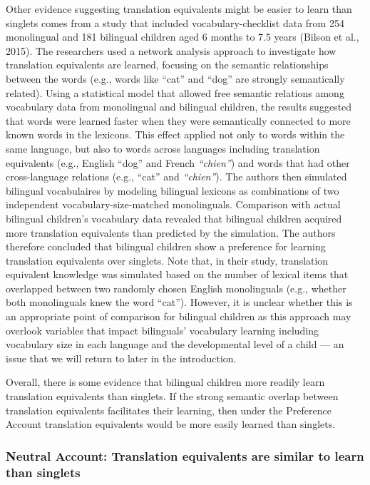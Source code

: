 \documentclass[
  english,
  ,man,floatsintext]{apa6}
\begin{document}
Other evidence suggesting translation equivalents might be easier to learn than singlets comes from a study that included vocabulary-checklist data from 254 monolingual and 181 bilingual children aged 6 months to 7.5 years (Bilson et al., 2015). The researchers used a network analysis approach to investigate how translation equivalents are learned, focusing on the semantic relationships between the words (e.g., words like ``cat'' and ``dog'' are strongly semantically related). Using a statistical model that allowed free semantic relations among vocabulary data from monolingual and bilingual children, the results suggested that words were learned faster when they were semantically connected to more known words in the lexicons. This effect applied not only to words within the same language, but also to words across languages including translation equivalents (e.g., English ``dog'' and French \emph{``chien''}) and words that had other cross-language relations (e.g., ``cat'' and \emph{``chien''}). The authors then simulated bilingual vocabulaires by modeling bilingual lexicons as combinations of two independent vocabulary-size-matched monolinguals. Comparison with actual bilingual children's vocabulary data revealed that bilingual children acquired more translation equivalents than predicted by the simulation. The authors therefore concluded that bilingual children show a preference for learning translation equivalents over singlets. Note that, in their study, translation equivalent knowledge was simulated based on the number of lexical items that overlapped between two randomly chosen English monolinguals (e.g., whether both monolinguals knew the word ``cat''). However, it is unclear whether this is an appropriate point of comparison for bilingual children as this approach may overlook variables that impact bilinguals' vocabulary learning including vocabulary size in each language and the developmental level of a child --- an issue that we will return to later in the introduction.

Overall, there is some evidence that bilingual children more readily learn translation equivalents than singlets. If the strong semantic overlap between translation equivalents facilitates their learning, then under the Preference Account translation equivalents would be more easily learned than singlets.

\hypertarget{neutral-account-translation-equivalents-are-similar-to-learn-than-singlets}{%
\subsubsection{Neutral Account: Translation equivalents are similar to learn than singlets}\label{neutral-account-translation-equivalents-are-similar-to-learn-than-singlets}}
\end{document}
